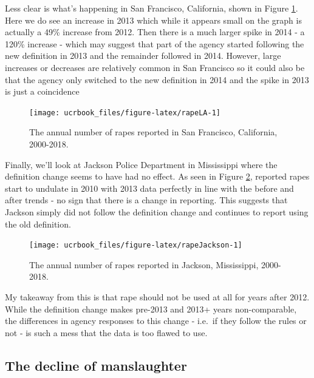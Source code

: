 \documentclass[
  12pt,
  openany]{book}
\begin{document}
Less clear is what's happening in San Francisco, California, shown in Figure \ref{fig:rapeLA}.
Here we do see an increase in 2013 which while it appears small on the graph is actually a 49\% increase from 2012. Then there is a much larger spike in 2014 - a 120\% increase - which may suggest that part of the agency started following the new definition in 2013 and the remainder followed in 2014. However, large increases or decreases are relatively common in San Francisco so it could also be that the agency only switched to the new definition in 2014 and the spike in 2013 is just a coincidence

\begin{figure}

{\centering \texttt{[image: ucrbook\_files/figure-latex/rapeLA-1]} 

}

\caption{The annual number of rapes reported in San Francisco, California, 2000-2018.}\label{fig:rapeLA}
\end{figure}

Finally, we'll look at Jackson Police Department in Mississippi where the definition change seems to have had no effect. As seen in Figure \ref{fig:rapeJackson}, reported rapes start to undulate in 2010 with 2013 data perfectly in line with the before and after trends - no sign that there is a change in reporting. This suggests that Jackson simply did not follow the definition change and continues to report using the old definition.

\begin{figure}

{\centering \texttt{[image: ucrbook\_files/figure-latex/rapeJackson-1]} 

}

\caption{The annual number of rapes reported in Jackson, Mississippi, 2000-2018.}\label{fig:rapeJackson}
\end{figure}

My takeaway from this is that rape should not be used at all for years after 2012. While the definition change makes pre-2013 and 2013+ years non-comparable, the differences in agency responses to this change - i.e.~if they follow the rules or not - is such a mess that the data is too flawed to use.

\hypertarget{the-decline-of-manslaughter}{%
\subsection{The decline of manslaughter}\label{the-decline-of-manslaughter}}
\end{document}

